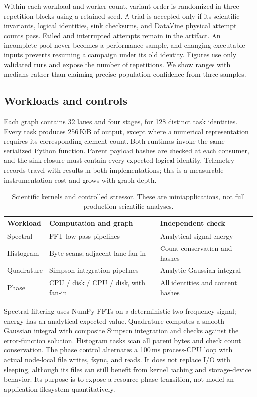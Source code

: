 Within each workload and worker count, variant order is randomized in three
repetition blocks using a retained seed. A trial is accepted only if its
scientific invariants, logical identities, sink checksums, and DataVine physical
attempt counts pass. Failed and interrupted attempts remain in the artifact.
An incomplete pool never becomes a performance sample, and changing executable
inputs prevents resuming a campaign under its old identity. Figures use only
validated runs and expose the number of repetitions. We show ranges with
medians rather than claiming precise population confidence from three samples.

\subsection{Workloads and controls}
Each graph contains 32 lanes and four stages, for 128 distinct task identities.
Every task produces 256\,KiB of output, except where a numerical representation
requires its corresponding element count. Both runtimes invoke the same
serialized Python function. Parent payload hashes are checked at each consumer,
and the sink closure must contain every expected logical identity. Telemetry
records travel with results in both implementations; this is a measurable
instrumentation cost and grows with graph depth.

\begin{table}[t]
\centering\small
\caption{Scientific kernels and controlled stressor. These are miniapplications,
not full production scientific analyses.}
\label{tab:workloads}
\begin{tabular}{@{}p{}p{}p{}@{}}
\toprule
Workload & Computation and graph & Independent check \\
\midrule
Spectral & FFT low-pass pipelines & Analytical signal energy \\
Histogram & Byte scans; adjacent-lane fan-in & Count conservation and hashes \\
Quadrature & Simpson integration pipelines & Analytic Gaussian integral \\
Phase & CPU / disk / CPU / disk, with fan-in & All identities and content hashes \\
\bottomrule
\end{tabular}
\end{table}

Spectral filtering uses NumPy FFTs on a deterministic two-frequency signal;
energy has an analytical expected value. Quadrature computes a smooth Gaussian
integral with composite Simpson integration and checks against the error-function
solution. Histogram tasks scan all parent bytes and check count conservation.
The phase control alternates a 100\,ms process-CPU loop with actual node-local
file writes, fsync, and reads. It does not replace I/O with sleeping, although
its files can still benefit from kernel caching and storage-device behavior.
Its purpose is to expose a resource-phase transition, not model an application
filesystem quantitatively.


